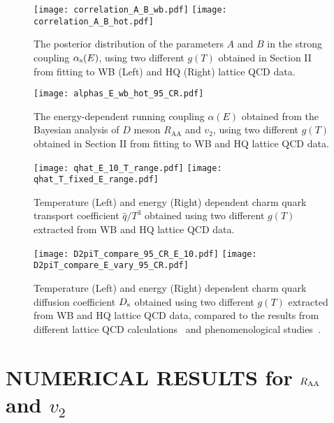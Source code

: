 \documentclass[aps,superscriptaddress,prc,twocolumn,nofootinbib]{revtex4}
\begin{document}
\begin{figure}[tbh]
\texttt{[image: correlation\_A\_B\_wb.pdf]}
\texttt{[image: correlation\_A\_B\_hot.pdf]}
	\caption{The posterior distribution of the parameters $A$ and $B$ in the strong coupling $\alpha_{\rm s}(E)$, using two different $g(T)$ obtained in Section II from fitting to WB (Left) and HQ (Right) lattice QCD data.}
	\label{AB}
\vspace{12pt}
\texttt{[image: alphas\_E\_wb\_hot\_95\_CR.pdf]}
	\caption{The energy-dependent running coupling $\alpha(E)$ obtained from the Bayesian analysis of $D$ meson $R_\mathrm{AA}$ and $v_2$, using two different $g(T)$ obtained in Section II from fitting to WB and HQ lattice QCD data.}
	\label{alphaE}
\end{figure}


\begin{figure*}[tbh]
\texttt{[image: qhat\_E\_10\_T\_range.pdf]}
\texttt{[image: qhat\_T\_fixed\_E\_range.pdf]}
\caption{ Temperature (Left) and energy (Right) dependent charm quark transport coefficient $\hat{q}/T^3$ obtained using two different $g(T)$ extracted from WB and HQ lattice QCD data. }
	\label{qhatT3}
\vspace{12pt}
\texttt{[image: D2piT\_compare\_95\_CR\_E\_10.pdf]}
\texttt{[image: D2piT\_compare\_E\_vary\_95\_CR.pdf]}
\caption{Temperature (Left) and energy (Right) dependent charm quark diffusion coefficient $D_{\rm s}$ obtained using two different $g(T)$ extracted from WB and HQ lattice QCD data, compared to the results from different lattice QCD calculations~\cite{Ding:2012sp, Banerjee:2011ra} and phenomenological studies~\cite{Song:2015ykw,Scardina:2017ipo,Riek:2010fk,Gossiaux:2008jv,Xu:2017obm}.}
	\label{Ds2piT}
\end{figure*}


\section{NUMERICAL RESULTS for $R_{\rm AA}$ and $v_2$}
\label{sec:results}
\end{document}
